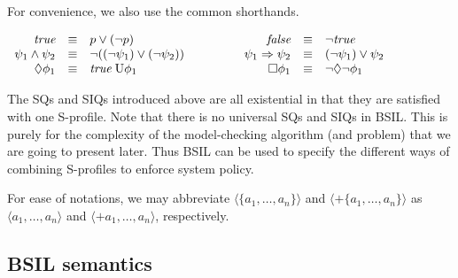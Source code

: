 \documentclass[11pt]{article}
\newcommand{\true}{\mbox{\em true}}
\newcommand{\false}{\mbox{\em false}}
\newcommand{\pfrr}{\Box}
\newcommand{\until}{\textrm{U}} %
\newcommand{\pevt}{\Diamond}
\begin{document}
For convenience, we also use the common shorthands.
\begin{center}
$\begin{array}{rclcrcl}
\true
& \equiv & p\vee(\neg p) 
& \hspace*{10mm} & %
\false
& \equiv & \neg\true \\
\psi_1\wedge \psi_2
& \equiv & \neg((\neg\psi_1)\vee(\neg\psi_2)) 
& \hspace*{10mm} & %
\psi_1\Rightarrow \psi_2
& \equiv & (\neg \psi_1)\vee \psi_2 \\
\pevt \phi_1
& \equiv & \true\;\until \phi_1 
& \hspace*{10mm} & %
\pfrr \phi_1
& \equiv & \neg\pevt\neg\phi_1 \\
\end{array}$
\end{center} 
The SQs and SIQs introduced above are 
all existential in that they are satisfied with one S-profile.  
Note that there is no universal SQs and SIQs in BSIL.  
This is purely for the complexity of the model-checking algorithm (and problem)
that we are going to present later.  
Thus BSIL can be used to specify the different ways of combining S-profiles 
to enforce system policy.  

For ease of notations, 
we may abbreviate 
$\langle \{a_1,\ldots,a_n\}\rangle$ and  
$\langle+ \{a_1,\ldots,a_n\}\rangle$ as 
$\langle a_1,\ldots,a_n\rangle$ and  
$\langle+a_1,\ldots,a_n\rangle$, respectively.




\subsection{BSIL semantics 
\label{subsec.bsil.semantics}}
\end{document}
